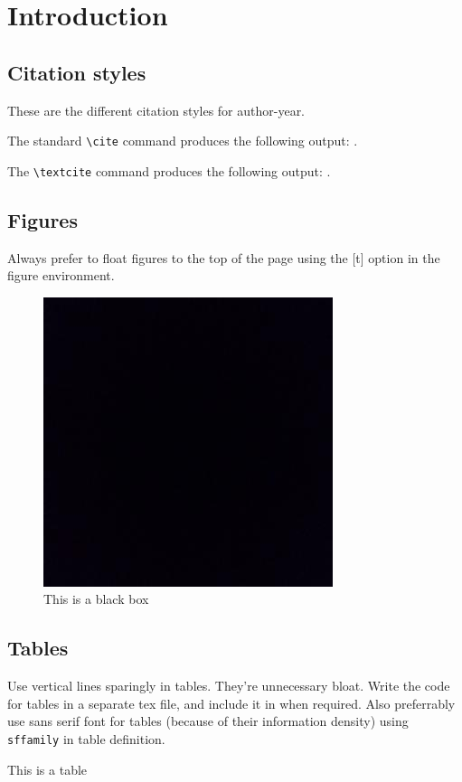 \chapter{Introduction}
\label{chap:introduction}

\section{Citation styles}

These are the different citation styles for author-year.

The standard \verb=\cite= command produces the following output: \cite{clarke1990rendezvous}.

The \verb=\textcite= command produces the following output: \textcite{clarke1990rendezvous}.

\clearpage          %

\section{Figures}

Always prefer to float figures to the top of the page using the [t] option in the figure environment.

\begin{figure}[t]
    \centering
    \includegraphics{figures/blackbox.jpeg}
    \caption{This is a black box}
    \label{fig:fig_1}
\end{figure}

\clearpage

\section{Tables}

Use vertical lines sparingly in tables. They're unnecessary bloat. Write the code for tables in a separate tex file, and include it in when required. Also preferrably use sans serif font for tables (because of their information density) using \texttt{\\sffamily} in table definition.

\begin{table}[!ht]
\small
\centering
\sffamily

\caption{This is a table}
\label{tab:table}
\vspace{-5mm}
\end{table}

